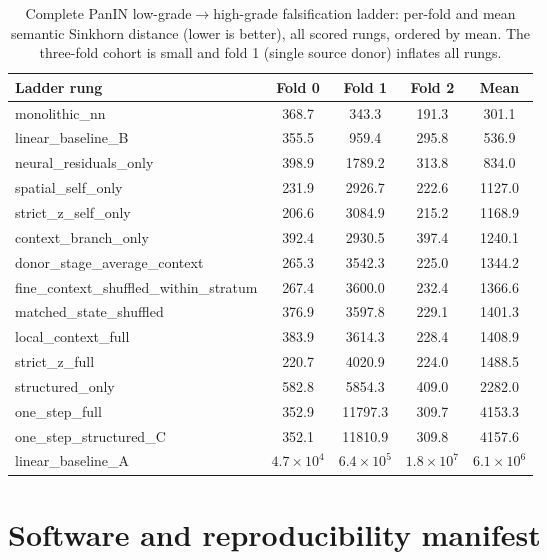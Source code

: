 \begin{table}[htbp]
  \centering
  \caption[Complete PanIN falsification ladder]{Complete PanIN low-grade$\rightarrow$high-grade
  falsification ladder: per-fold and mean semantic Sinkhorn distance (lower is better), all scored
  rungs, ordered by mean. The three-fold cohort is small and fold 1 (single source donor) inflates
  all rungs.}
  \label{tab:app-c-ladder-panin}
  \footnotesize
  \begin{tabular}{lcccc}
    \toprule
    Ladder rung & Fold 0 & Fold 1 & Fold 2 & Mean \\
    \midrule
    monolithic\_nn & 368.7 & 343.3 & 191.3 & 301.1 \\
    linear\_baseline\_B & 355.5 & 959.4 & 295.8 & 536.9 \\
    neural\_residuals\_only & 398.9 & 1789.2 & 313.8 & 834.0 \\
    spatial\_self\_only & 231.9 & 2926.7 & 222.6 & 1127.0 \\
    strict\_z\_self\_only & 206.6 & 3084.9 & 215.2 & 1168.9 \\
    context\_branch\_only & 392.4 & 2930.5 & 397.4 & 1240.1 \\
    donor\_stage\_average\_context & 265.3 & 3542.3 & 225.0 & 1344.2 \\
    fine\_context\_shuffled\_within\_stratum & 267.4 & 3600.0 & 232.4 & 1366.6 \\
    matched\_state\_shuffled & 376.9 & 3597.8 & 229.1 & 1401.3 \\
    local\_context\_full & 383.9 & 3614.3 & 228.4 & 1408.9 \\
    strict\_z\_full & 220.7 & 4020.9 & 224.0 & 1488.5 \\
    structured\_only & 582.8 & 5854.3 & 409.0 & 2282.0 \\
    one\_step\_full & 352.9 & 11797.3 & 309.7 & 4153.3 \\
    one\_step\_structured\_C & 352.1 & 11810.9 & 309.8 & 4157.6 \\
    linear\_baseline\_A & $4.7\!\times\!10^{4}$ & $6.4\!\times\!10^{5}$ & $1.8\!\times\!10^{7}$ & $6.1\!\times\!10^{6}$ \\
    \bottomrule
  \end{tabular}
\end{table}

\section{Software and reproducibility manifest}\label{sec:app-c-software}

